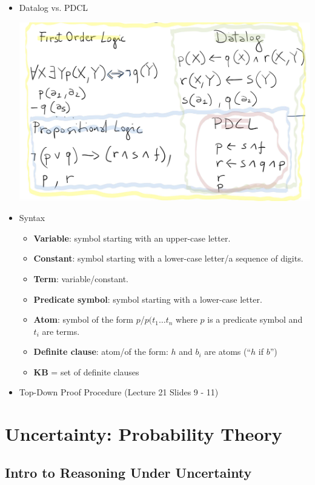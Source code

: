 \documentclass{article}
\begin{document}
\begin{itemize}
    \item Datalog vs. PDCL

    \includegraphics[scale=0.3]{datalog_vs_pdcl}
    \item Syntax
        \begin{itemize}
            \item \textbf{Variable}: symbol starting with an upper-case letter.
            \item \textbf{Constant}: symbol starting with a lower-case letter/a sequence of digits.
            \item \textbf{Term}: variable/constant.
            \item \textbf{Predicate symbol}: symbol starting with a lower-case letter.
            \item \textbf{Atom}: symbol of the form $p$/$p(t_1 \ldots t_n$ where $p$ is a predicate symbol and $t_i$ are terms.
            \item \textbf{Definite clause}: atom/of the form: $h$ and $b_i$ are atoms (``$h$ if $b$'')
            \item \textbf{KB} = set of definite clauses
        \end{itemize}
    \item Top-Down Proof Procedure (Lecture 21 Slides 9 - 11)
\end{itemize}

\section{Uncertainty: Probability Theory}

\subsection{Intro to Reasoning Under Uncertainty}
\end{document}
